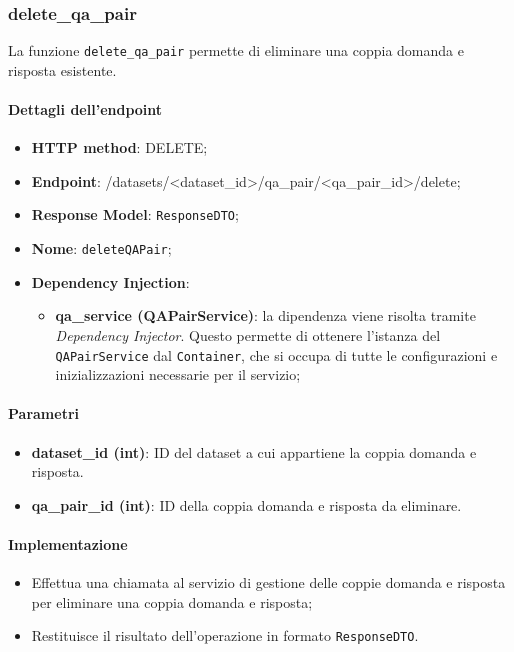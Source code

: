 \subsubsection{delete\_qa\_pair}
La funzione \texttt{delete\_qa\_pair} permette di eliminare una coppia domanda e risposta esistente.
\paragraph{Dettagli dell'endpoint}
\begin{itemize}
    \item \textbf{HTTP method}: DELETE;
    \item \textbf{Endpoint}: /datasets/\textless dataset\_id\textgreater/qa\_pair/\textless qa\_pair\_id\textgreater/delete;
    \item \textbf{Response Model}: \texttt{ResponseDTO};
    \item \textbf{Nome}: \texttt{deleteQAPair};
    \item \textbf{Dependency Injection}: 
    \begin{itemize}
        \item \textbf{qa\_service (QAPairService)}: la dipendenza viene risolta tramite \textit{Dependency Injector}. Questo permette di ottenere l'istanza del \texttt{QAPairService} dal \texttt{Container}, che si occupa di tutte le configurazioni e inizializzazioni necessarie per il servizio;
    \end{itemize}
\end{itemize}

\paragraph{Parametri}
\begin{itemize}
    \item \textbf{dataset\_id (int)}: ID del dataset a cui appartiene la coppia domanda e risposta.
    \item \textbf{qa\_pair\_id (int)}: ID della coppia domanda e risposta da eliminare.
\end{itemize}
\paragraph{Implementazione}
\begin{itemize}
    \item Effettua una chiamata al servizio di gestione delle coppie domanda e risposta per eliminare una coppia domanda e risposta;
    \item Restituisce il risultato dell'operazione in formato \texttt{ResponseDTO}.
\end{itemize}

